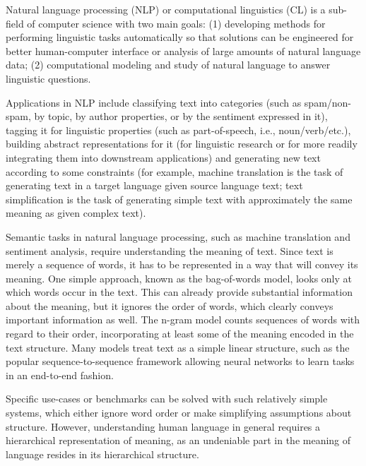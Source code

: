 \documentclass[12pt,a4paper]{report}
\begin{document}
Natural language processing (NLP) or computational linguistics (CL)
is a sub-field of computer science with two main goals:
(1) developing methods for performing linguistic tasks automatically
so that solutions can be engineered for better human-computer interface
or analysis of large amounts of natural language data;
(2) computational modeling and study of natural language to answer linguistic questions.

Applications in NLP include classifying text into categories
(such as spam/non-spam, by topic, by author properties, or by
the sentiment expressed in it),
tagging it for linguistic properties (such as part-of-speech, i.e., noun/verb/etc.),
building abstract representations for it (for linguistic research or for
more readily integrating them into downstream applications)
and generating new text according to some constraints (for example,
machine translation is the task of generating
text in a target language given source language text;
text simplification is the task of generating simple text with approximately the same
meaning as given complex text).

Semantic tasks in natural language processing, such as machine translation and
sentiment analysis, require understanding the meaning of text. Since text is
merely a sequence of words, it has to be represented in a way that will convey
its meaning. One simple approach, known as the bag-of-words model, looks only
at which words occur in the text.
This can already provide
substantial information about the meaning, but it ignores the order of words,
which clearly conveys important information as well. The n-gram model counts
sequences of words with regard to their order, incorporating at least some of
the meaning encoded in the text structure.
Many models treat text as a simple linear structure,
such as the popular sequence-to-sequence framework allowing neural networks
to learn tasks in an end-to-end fashion.

Specific use-cases or benchmarks can be solved with such relatively simple
systems, which either ignore word order or make simplifying assumptions about structure.
However, understanding human language in general
requires a hierarchical representation of meaning,
as an undeniable part in the
meaning of language resides in its hierarchical structure.
\end{document}
